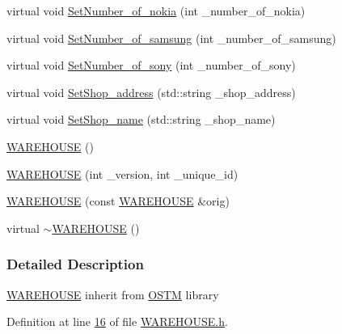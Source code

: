 \begin{DoxyCompactItemize}
virtual void \hyperlink{class_w_a_r_e_h_o_u_s_e_a300d1fe21a47e45c0d5d27e25add346f_a300d1fe21a47e45c0d5d27e25add346f}{Set\+Number\+\_\+of\+\_\+nokia} (int \+\_\+number\+\_\+of\+\_\+nokia)
\item 
virtual void \hyperlink{class_w_a_r_e_h_o_u_s_e_a5564efbb5f54f663208a17c6f7f440e2_a5564efbb5f54f663208a17c6f7f440e2}{Set\+Number\+\_\+of\+\_\+samsung} (int \+\_\+number\+\_\+of\+\_\+samsung)
\item 
virtual void \hyperlink{class_w_a_r_e_h_o_u_s_e_a709e5a9f4b439d0507fe74cc1a362ee1_a709e5a9f4b439d0507fe74cc1a362ee1}{Set\+Number\+\_\+of\+\_\+sony} (int \+\_\+number\+\_\+of\+\_\+sony)
\item 
virtual void \hyperlink{class_w_a_r_e_h_o_u_s_e_a1accf4c214a11a532cad88729d44b91d_a1accf4c214a11a532cad88729d44b91d}{Set\+Shop\+\_\+address} (std\+::string \+\_\+shop\+\_\+address)
\item 
virtual void \hyperlink{class_w_a_r_e_h_o_u_s_e_ae5cb8c03a4ef0d2e84bbe34312bb01e4_ae5cb8c03a4ef0d2e84bbe34312bb01e4}{Set\+Shop\+\_\+name} (std\+::string \+\_\+shop\+\_\+name)
\item 
\hyperlink{class_w_a_r_e_h_o_u_s_e_a7a924d389af91f54ed0e1d1d8d56ec57_a7a924d389af91f54ed0e1d1d8d56ec57}{W\+A\+R\+E\+H\+O\+U\+SE} ()
\item 
\hyperlink{class_w_a_r_e_h_o_u_s_e_a91a50ed8f6eeb344b1785f750532b18a_a91a50ed8f6eeb344b1785f750532b18a}{W\+A\+R\+E\+H\+O\+U\+SE} (int \+\_\+version, int \+\_\+unique\+\_\+id)
\item 
\hyperlink{class_w_a_r_e_h_o_u_s_e_a4782d251d2203377f8e9f331ba3b0a7e_a4782d251d2203377f8e9f331ba3b0a7e}{W\+A\+R\+E\+H\+O\+U\+SE} (const \hyperlink{class_w_a_r_e_h_o_u_s_e}{W\+A\+R\+E\+H\+O\+U\+SE} \&orig)
\item 
virtual \hyperlink{class_w_a_r_e_h_o_u_s_e_ad5aa686839d7be9bfea33d469c58086b_ad5aa686839d7be9bfea33d469c58086b}{$\sim$\+W\+A\+R\+E\+H\+O\+U\+SE} ()
\end{DoxyCompactItemize}


\subsubsection{Detailed Description}
\hyperlink{class_w_a_r_e_h_o_u_s_e}{W\+A\+R\+E\+H\+O\+U\+SE} inherit from \hyperlink{class_o_s_t_m}{O\+S\+TM} library 

Definition at line \hyperlink{_w_a_r_e_h_o_u_s_e_8h_source_l00016}{16} of file \hyperlink{_w_a_r_e_h_o_u_s_e_8h_source}{W\+A\+R\+E\+H\+O\+U\+S\+E.\+h}.




